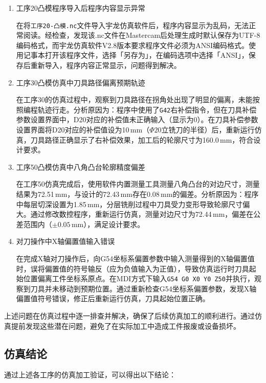 \documentclass{xautCADreport}
\begin{document}
\begin{enumerate}
  \item 工序20凸模程序导入后程序内容显示异常
  
  在将\texttt{工序20-凸模.nc}文件导入宇龙仿真软件后，程序内容显示为乱码，无法正常阅读。经检查，发现该.nc文件在Mastercam后处理生成时默认保存为UTF-8编码格式，而宇龙仿真软件V2.8版本要求程序文件必须为ANSI编码格式。使用记事本打开该程序文件，选择「另存为」，在编码选项中选择「ANSI」，保存后重新导入，程序内容正常显示，问题得到解决。
  
  \item 工序30凸模仿真中刀具路径偏离预期轨迹
  
  在工序30的仿真过程中，观察到刀具路径在拐角处出现了明显的偏离，未能按照编程轨迹行走。分析原因为：程序中使用了\verb|G42|右补偿指令，但在刀具补偿参数设置界面中，D20对应的补偿值未正确输入（显示为0）。在刀具补偿参数设置界面将D20对应的补偿值设为10\,mm（$\Phi20$立铣刀的半径）后，重新运行仿真，刀具路径正确显示了右补偿效果，加工后的轮廓尺寸为160.0\,mm，符合设计要求。
  
  \item 工序50凸模仿真中八角凸台轮廓精度偏差
  
  在工序50仿真完成后，使用软件内置测量工具测量八角凸台的对边尺寸，测量结果为72.51\,mm，与设计的72.43\,mm存在0.08\,mm的偏差。分析原因为：程序中每层切深设置为1.85\,mm，分层铣削过程中刀具受力变形导致轮廓尺寸偏大。通过修改数控程序，重新运行仿真，测量对边尺寸为72.44\,mm，偏差在公差范围内（$\pm0.05$\,mm），满足设计要求。
  
  \item 对刀操作中X轴偏置值输入错误
  
  在完成X轴对刀操作后，向G54坐标系偏置参数中输入测量得到的X轴偏置值时，误将偏置值的符号输反（应为负值输入为正值），导致仿真运行时刀具起始位置偏离工件坐标系原点。在MDI方式下输入\verb|G54 G0 X0 Y0 Z50|并执行，观察到刀具并未移动到预期位置。通过重新检查G54坐标系偏置参数，发现X轴偏置值符号错误，修正后重新运行仿真，刀具起始位置正确。
\end{enumerate}

上述问题在仿真过程中逐一排查并解决，确保了后续仿真加工的顺利进行。通过仿真提前发现这些潜在问题，避免了在实际加工中造成工件报废或设备损坏。

\subsection{仿真结论}

通过上述各工序的仿真加工验证，可以得出以下结论：
\end{document}
